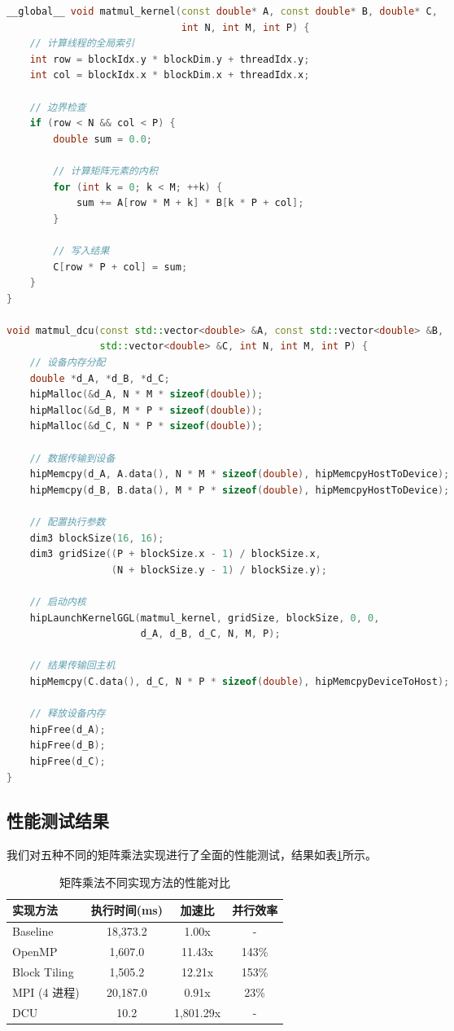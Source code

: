 \documentclass[12pt,a4paper]{article}
\begin{document}
\begin{lstlisting}[language=c++,caption=DCU硬件加速矩阵乘法内核]
__global__ void matmul_kernel(const double* A, const double* B, double* C,
                              int N, int M, int P) {
    // 计算线程的全局索引
    int row = blockIdx.y * blockDim.y + threadIdx.y;
    int col = blockIdx.x * blockDim.x + threadIdx.x;

    // 边界检查
    if (row < N && col < P) {
        double sum = 0.0;

        // 计算矩阵元素的内积
        for (int k = 0; k < M; ++k) {
            sum += A[row * M + k] * B[k * P + col];
        }

        // 写入结果
        C[row * P + col] = sum;
    }
}

void matmul_dcu(const std::vector<double> &A, const std::vector<double> &B,
                std::vector<double> &C, int N, int M, int P) {
    // 设备内存分配
    double *d_A, *d_B, *d_C;
    hipMalloc(&d_A, N * M * sizeof(double));
    hipMalloc(&d_B, M * P * sizeof(double));
    hipMalloc(&d_C, N * P * sizeof(double));

    // 数据传输到设备
    hipMemcpy(d_A, A.data(), N * M * sizeof(double), hipMemcpyHostToDevice);
    hipMemcpy(d_B, B.data(), M * P * sizeof(double), hipMemcpyHostToDevice);

    // 配置执行参数
    dim3 blockSize(16, 16);
    dim3 gridSize((P + blockSize.x - 1) / blockSize.x,
                  (N + blockSize.y - 1) / blockSize.y);

    // 启动内核
    hipLaunchKernelGGL(matmul_kernel, gridSize, blockSize, 0, 0,
                       d_A, d_B, d_C, N, M, P);

    // 结果传输回主机
    hipMemcpy(C.data(), d_C, N * P * sizeof(double), hipMemcpyDeviceToHost);

    // 释放设备内存
    hipFree(d_A);
    hipFree(d_B);
    hipFree(d_C);
}
\end{lstlisting}

\subsection{性能测试结果}

我们对五种不同的矩阵乘法实现进行了全面的性能测试，结果如表\ref{tab:matmul_performance}所示。

\begin{table}[H]
\centering
\caption{矩阵乘法不同实现方法的性能对比}
\label{tab:matmul_performance}
\begin{tabular}{lccc}
\toprule
实现方法 & 执行时间(ms) & 加速比 & 并行效率 \\
\midrule
Baseline & 18,373.2 & 1.00x & - \\
OpenMP & 1,607.0 & 11.43x & 143\% \\
Block Tiling & 1,505.2 & 12.21x & 153\% \\
MPI (4 进程) & 20,187.0 & 0.91x & 23\% \\
DCU & 10.2 & 1,801.29x & - \\
\bottomrule
\end{tabular}
\end{table}
\end{document}
